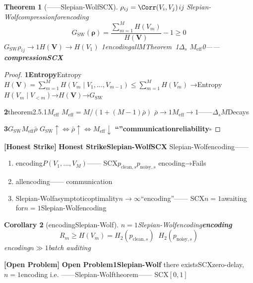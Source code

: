 \documentclass[11pt,a4paper]{article}
\newtheorem{theorem}{Theorem}[section]
\newtheorem{corollary}[theorem]{Corollary}
\theoremstyle{remark}
\newcommand{\openproblem}{\textnormal{\textbf{[Open Problem]}}}
\newcommand{\honeststrike}{\textnormal{\textbf{[Honest Strike]}}}
\begin{document}
\begin{theorem}[——Slepian-WolfSCX]
\label{thm:correlation_paradox}
$\rho_{ij} = \Corr(V_i, V_j)$$i$$j$
Slepian-Wolfcompressionforencoding
\begin{equation}
    \boxed{G_{\text{SW}}(\boldsymbol{\rho}) = \frac{\sum_{m=1}^{M} H(V_m)}{H(\mathbf{V})} - 1
    \geq 0}
\end{equation}
$G_{\text{SW}}$$\rho_{ij} \to 1$$H(\mathbf{V}) \to H(V_1)$
1encodingall$M$Theorem~1$\Delta_s$
$M_{\text{eff}}$0——\textbf{compressionSCX}
\end{theorem}

\begin{proof}
\textbf{1Entropy}Entropy
$H(\mathbf{V}) = \sum_{m=1}^{M} H(V_m \mid V_1, \ldots, V_{m-1}) \leq \sum_{m=1}^{M} H(V_m)$
→Entropy$H(V_m \mid V_{<m})$→$H(\mathbf{V})$→$G_{\text{SW}}$

\textbf{2}theorem2.5.1$M_{\text{eff}}$
$M_{\text{eff}} = M / (1 + (M-1)\bar{\rho})$
$\bar{\rho} \to 1$$M_{\text{eff}} \to 1$——$\Delta_s$$M$Decays

\textbf{3}$G_{\text{SW}}$$M_{\text{eff}}$$\bar{\rho}$
$G_{\text{SW}} \uparrow \iff \bar{\rho} \uparrow \iff M_{\text{eff}} \downarrow$
\textbf{``''communicationreliability}\hfill $\square$
\end{proof}

\honeststrike{} \textbf{Honest StrikeSlepian-WolfSCX}
Slepian-Wolfencoding——\textbf{}
\begin{enumerate}[label=(\arabic*)]
    \item \textbf{}encoding$P(V_1, \ldots, V_M)$——
          SCX$p_{\text{clean},s}$$p_{\text{noisy},s}$\textbf{}
          encoding→Fails
    \item \textbf{}allencoding——
          communication
    \item \textbf{}Slepian-Wolfasymptoticoptimality$n \to \infty$``encoding''——
          SCX$n=1$awaiting
          for$n=1$Slepian-Wolfencoding
\end{enumerate}

\begin{corollary}[encodingSlepian-Wolf]
\label{cor:slepian_wolf_degenerate}
$n=1$Slepian-Wolfencoding\textbf{encoding}
\begin{equation}
    \boxed{R_m \geq H(V_m) = H_2(p_{\text{clean},s}) \;\text{}\; H_2(p_{\text{noisy},s})}
\end{equation}
encoding$n \gg 1$batch auditing
\end{corollary}

\openproblem{} \textbf{Open Problem1Slepian-Wolf}
there existsSCX\textbf{}zero-delay, $n=1$encoding
i.e.
——Slepian-Wolftheorem——
SCX$[0,1]$
\end{document}
